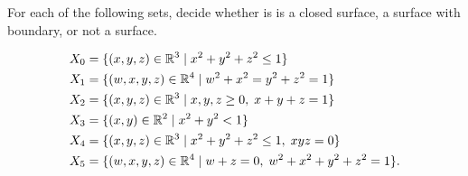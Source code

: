 \documentclass[a4paper]{amsart}
\begin{document}
\begin{exercise}
 For each of the following sets, decide whether is is a closed
 surface, a surface with boundary, or not a surface. 

 \begin{align*}
  X_0 &= \{(x,y,z)\in\mathbb{R}^3\;|\; x^2+y^2+z^2\leq 1\} \\
  X_1 &= \{(w,x,y,z)\in\mathbb{R}^4\;|\; w^2+x^2=y^2+z^2=1\} \\
  X_2 &= \{(x,y,z)\in\mathbb{R}^3\;|\; x,y,z\geq 0,\; x+y+z = 1\} \\
  X_3 &= \{(x,y)\in\mathbb{R}^2\;|\; x^2+y^2<1\} \\
  X_4 &= \{(x,y,z)\in\mathbb{R}^3\;|\; x^2+y^2+z^2\leq 1,\; xyz=0\} \\
  X_5 &= \{(w,x,y,z)\in\mathbb{R}^4\;|\; w+z=0,\;w^2+x^2+y^2+z^2=1\}.
 \end{align*}
\end{exercise}
\end{document}
